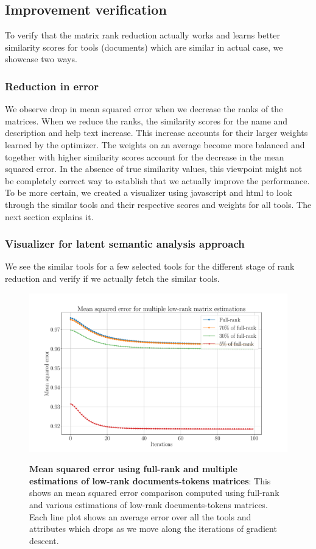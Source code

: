 \subsection{Improvement verification}
To verify that the matrix rank reduction actually works and learns better similarity scores for tools (documents) which are similar in actual case, we showcase two ways.

\subsubsection{Reduction in error}
We observe drop in mean squared error when we decrease the ranks of the matrices. When we reduce the ranks, the similarity scores for the name and description and help text increase. This increase accounts for their larger weights learned by the optimizer. The weights on an average become more balanced and together with higher similarity scores account for the decrease in the mean squared error. In the absence of true similarity values, this viewpoint might not be completely correct way to establish that we actually improve the performance. To be more certain, we created a visualizer using javascript and html to look through the similar tools and their respective scores and weights for all tools. The next section explains it.

\subsubsection{Visualizer for latent semantic analysis approach}
We see the similar tools for a few selected tools for the different stage of rank reduction and verify if we actually fetch the similar tools.

\begin{figure}[h]
\begin{centering}
    {\includegraphics[scale=0.35]{figures/MSE_iterations_low_rank.pdf}}
    \caption[Mean squared error using LSI]{\textbf{Mean squared error using full-rank and multiple estimations of low-rank documents-tokens matrices}: This shows an mean squared error comparison computed using full-rank and various estimations of low-rank documents-tokens matrices. Each line plot shows an average error over all the tools and attributes which drops as we move along the iterations of gradient descent.}
\end{centering}
\end{figure}

